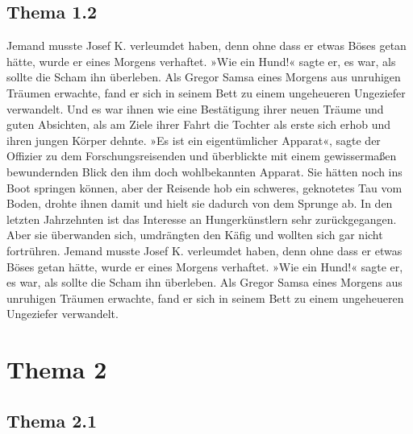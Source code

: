 \subsection{Thema 1.2}

Jemand musste Josef K. verleumdet haben, denn ohne dass er etwas Böses
getan hätte, wurde er eines Morgens verhaftet. »Wie ein Hund!« sagte er,
es war, als sollte die Scham ihn überleben. Als Gregor Samsa eines
Morgens aus unruhigen Träumen erwachte, fand er sich in seinem Bett zu
einem ungeheueren Ungeziefer verwandelt. Und es war ihnen wie eine
Bestätigung ihrer neuen Träume und guten Absichten, als am Ziele ihrer
Fahrt die Tochter als erste sich erhob und ihren jungen Körper dehnte.
»Es ist ein eigentümlicher Apparat«, sagte der Offizier zu dem
Forschungsreisenden und überblickte mit einem gewissermaßen bewundernden
Blick den ihm doch wohlbekannten Apparat. Sie hätten noch ins Boot
springen können, aber der Reisende hob ein schweres, geknotetes Tau vom
Boden, drohte ihnen damit und hielt sie dadurch von dem Sprunge ab. In
den letzten Jahrzehnten ist das Interesse an Hungerkünstlern sehr
zurückgegangen. Aber sie überwanden sich, umdrängten den Käfig und
wollten sich gar nicht fortrühren. Jemand musste Josef K. verleumdet
haben, denn ohne dass er etwas Böses getan hätte, wurde er eines Morgens
verhaftet. »Wie ein Hund!« sagte er, es war, als sollte die Scham ihn
überleben. Als Gregor Samsa eines Morgens aus unruhigen Träumen
erwachte, fand er sich in seinem Bett zu einem ungeheueren Ungeziefer
verwandelt.

\section{Thema 2}

\subsection{Thema 2.1}

